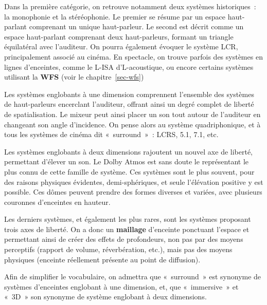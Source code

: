 \documentclass[
  letterpaper,
  DIV=11,
  numbers=noendperiod]{scrreprt}
\begin{document}
Dans la première catégorie, on retrouve notamment deux systèmes
historiques~: la monophonie et la stéréophonie. Le premier se résume par
un espace haut-parlant comprenant un unique haut-parleur. Le second est
décrit comme un espace haut-parlant comprenant deux haut-parleurs,
formant un triangle équilatéral avec l'auditeur. On pourra également
évoquer le système LCR, principalement associé au cinéma. En spectacle,
on trouve parfois des systèmes en lignes d'enceintes, comme le L-ISA
d'L-acoustique, ou encore certains systèmes utilisant la \textbf{WFS}
(voir le chapitre~\ref{sec-wfs})

Les systèmes englobants à une dimension comprennent l'ensemble des
systèmes de haut-parleurs encerclant l'auditeur, offrant ainsi un degré
complet de liberté de spatialisation. Le mixeur peut ainsi placer un son
tout autour de l'auditeur en changeant son angle d'incidence. On pense
alors au système quadriphonique, et à tous les systèmes de cinéma dit
«~surround~»~: LCRS, 5.1, 7.1, etc.

Les systèmes englobants à deux dimensions rajoutent un nouvel axe de
liberté, permettant d'élever un son. Le Dolby Atmos est sans doute le
représentant le plus connu de cette famille de système. Ces systèmes
sont le plus souvent, pour des raisons physiques évidentes,
demi-sphériques, et seule l'élévation positive y est possible. Ces dômes
peuvent prendre des formes diverses et variées, avec plusieurs couronnes
d'enceintes en hauteur.

Les derniers systèmes, et également les plus rares, sont les systèmes
proposant trois axes de liberté. On a donc un \textbf{maillage}
d'enceinte ponctuant l'espace et permettant ainsi de créer des effets de
profondeurs, non pas par des moyens perceptifs (rapport de volume,
réverbération, etc.), mais pas des moyens physiques (enceinte réellement
présente au point de diffusion).

\begin{tcolorbox}[enhanced jigsaw, leftrule=.75mm, arc=.35mm, bottomtitle=1mm, colback=white, colbacktitle=quarto-callout-tip-color!10!white, opacityback=0, left=2mm, rightrule=.15mm, opacitybacktitle=0.6, breakable, toptitle=1mm, titlerule=0mm, bottomrule=.15mm, toprule=.15mm, coltitle=black, title=\textcolor{quarto-callout-tip-color}{\faLightbulb}\hspace{0.5em}{Astuce}]

Afin de simplifier le vocabulaire, on admettra que «~surround~» est
synonyme de systèmes d'enceintes englobant à une dimension, et, que
«~immersive~» et «~3D~» son synonyme de système englobant à deux
dimensions.

\end{tcolorbox}
\end{document}
